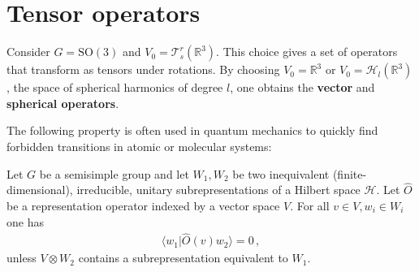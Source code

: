\section{Tensor operators}

    \begin{example}
        Consider $G=\mathrm{SO}(3)$ and $V_0=\mathcal{T}^r_s(\mathbb{R}^3)$. This choice gives a set of operators that transform as tensors under rotations. By choosing $V_0=\mathbb{R}^3$ or $V_0=\mathcal{H}_l(\mathbb{R}^3)$, the space of spherical harmonics of degree $l$, one obtains the \textbf{vector} and \textbf{spherical operators}.
    \end{example}

    The following property is often used in quantum mechanics to quickly find forbidden transitions in atomic or molecular systems:
    \begin{property}
        Let $G$ be a semisimple group and let $W_1,W_2$ be two inequivalent (finite-dimensional), irreducible, unitary subrepresentations of a Hilbert space $\mathcal{H}$. Let $\hat{O}$ be a representation operator indexed by a vector space $V$. For all $v\in V,w_i\in W_i$ one has
        \begin{gather}
            \langle w_1\vert\hat{O}(v)w_2 \rangle=0\,,
        \end{gather}
        unless $V\otimes W_2$ contains a subrepresentation equivalent to $W_1$.
    \end{property}

